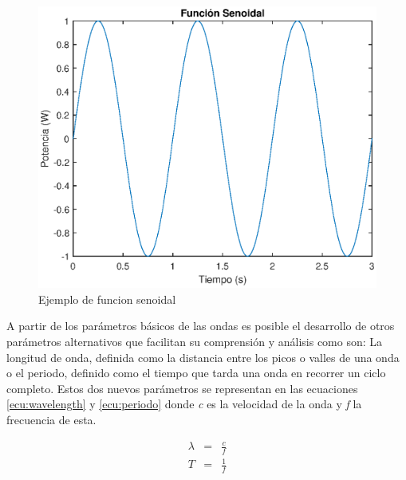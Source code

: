 \begin{figure}[h]
    \centering
        \includegraphics[width=15cm]{archivos/seno}
        \caption{Ejemplo de funcion senoidal}
        \label{fig:seno}
\end{figure}

\par A partir de los parámetros básicos de las ondas es posible el desarrollo de otros parámetros alternativos que facilitan su comprensión y análisis como son: La longitud de onda, definida como la distancia entre los picos o valles de una onda o el periodo, definido como el tiempo que tarda una onda en recorrer un ciclo completo. Estos dos nuevos parámetros se representan en las ecuaciones \ref{ecu:wavelength} y \ref{ecu:periodo} donde \textit{c} es la velocidad de la onda y \textit{f} la frecuencia de esta.

\begin{subequations}
	\begin{eqnarray}
		\lambda &=& \frac{c}{f} \label{ecu:wavelength} \\ %
		T &=& \frac{1}{f} \label{ecu:periodo}
	\end{eqnarray}
\end{subequations}


